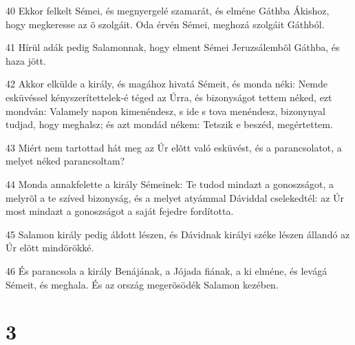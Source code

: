 \par 40 Ekkor felkelt Sémei, és megnyergelé szamarát, és elméne Gáthba Ákishoz, hogy megkeresse az õ szolgáit. Oda érvén Sémei, meghozá szolgáit Gáthból.
\par 41 Hírül adák pedig Salamonnak, hogy elment Sémei Jeruzsálembõl Gáthba, és haza jött.
\par 42 Akkor elkülde a király, és magához hivatá Sémeit, és monda néki: Nemde esküvéssel kényszerítettelek-é téged az Úrra, és bizonyságot tettem néked, ezt mondván: Valamely napon kimenéndesz, s ide s tova menéndesz, bizonynyal tudjad, hogy meghalsz; és azt mondád nékem: Tetszik e beszéd, megértettem.
\par 43 Miért nem tartottad hát meg az Úr elõtt való esküvést, és a parancsolatot, a melyet néked parancsoltam?
\par 44 Monda annakfelette a király Sémeinek: Te tudod mindazt a gonoszságot, a melyrõl a te szíved bizonyság, és a melyet atyámmal Dáviddal cselekedtél: az Úr most mindazt a gonoszságot a saját fejedre fordította.
\par 45 Salamon király pedig áldott lészen, és Dávidnak királyi széke lészen állandó az Úr elõtt mindörökké.
\par 46 És parancsola a király Benájának, a Jójada fiának, a ki elméne, és levágá Sémeit, és meghala. És az ország megerõsödék Salamon kezében.

\chapter{3}

